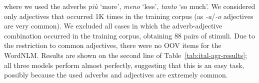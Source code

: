 where we used the adverbs \emph{pi{\`u}} `more', \emph{meno} `less',
\emph{tanto} `so much'. We considered only adjectives that occurred 1K
times in the training corpus (as \emph{-a}/\emph{-o} adjectives are
very common). We excluded all cases in which the
adverb-adjective combination occurred in the training corpus, obtaining 88 pairs of stimuli.
Due to the restriction to common adjectives, there were no OOV items
for the WordNLM. %
%
Results are shown on the second line of
Table~\ref{tab:ital-agr-results}; all three models perform almost
perfectly, suggesting that this is an easy task, possibly because the
used adverbs and adjectives are extremely common.

